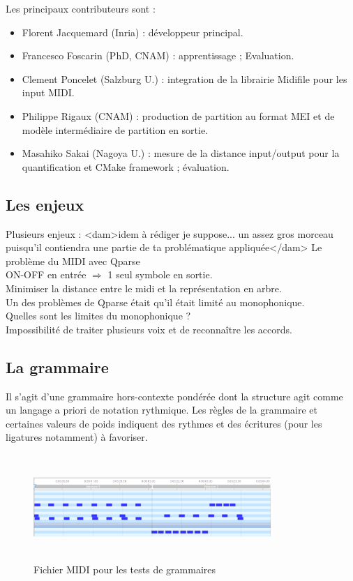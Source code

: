 Les principaux contributeurs sont :
\begin{itemize}
	\item Florent Jacquemard (Inria) : développeur principal.
	\item Francesco Foscarin (PhD, CNAM) : apprentissage ; Evaluation.
	\item Clement Poncelet (Salzburg U.) : integration de la librairie Midifile
        pour les input MIDI.
	\item Philippe Rigaux (CNAM) : production de partition au format MEI et de
        modèle intermédiaire de partition en sortie.
	\item Masahiko Sakai (Nagoya U.) : mesure de la distance input/output pour
        la quantification et CMake framework ; évaluation.
\end{itemize}

\subsection*{Les enjeux}
Plusieurs enjeux : <dam>idem à rédiger je suppose... un assez gros morceau
puisqu'il contiendra une partie de ta problématique appliquée</dam>
Le problème du MIDI avec Qparse\\
ON-OFF en entrée $\Rightarrow$ 1 seul symbole en sortie.\\
Minimiser la distance entre le midi et la représentation en arbre.\\
Un des problèmes de Qparse était qu’il était limité au monophonique.\\
Quelles sont les limites du monophonique ?\\
Impossibilité de traiter plusieurs voix et de reconnaître les accords.

\subsection*{La grammaire}
\label{gram}
Il s’agit d’une grammaire hors-contexte pondérée dont la structure agit comme
un langage a priori de notation rythmique. Les règles de la grammaire et
certaines valeurs de poids indiquent des rythmes et des écritures (pour les
ligatures notamment) à favoriser.\\

\begin{figure}[h]
    \centering
    \includegraphics[height=40mm, width=90mm]{
    z_images/4_experimentations/3_developpement/0_midi_2bars_fill.png}
    \caption{Fichier MIDI pour les tests de grammaires}
    \label{midi_gram}
\end{figure}

